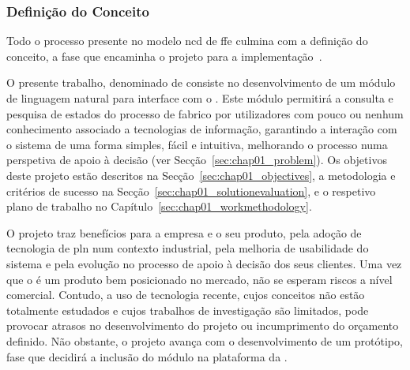 \subsubsection{Definição do Conceito}

Todo o processo presente no modelo \gls{ncd} de \gls{ffe} culmina com a definição do conceito, a fase que encaminha o projeto para a implementação~\parencite{ffe_effectivemethods_tools_techniques}.

O presente trabalho, denominado de  consiste no desenvolvimento de um módulo de linguagem natural para interface com o {\productname}. Este módulo permitirá a consulta e pesquisa de estados do processo de fabrico por utilizadores com pouco ou nenhum conhecimento associado a tecnologias de informação, garantindo a interação com o sistema de uma forma simples, fácil e intuitiva, melhorando o processo numa perspetiva de apoio à decisão (ver Secção~\ref{sec:chap01_problem}). Os objetivos deste projeto estão descritos na Secção~\ref{sec:chap01_objectives}, a metodologia e critérios de sucesso na Secção~\ref{sec:chap01_solutionevaluation}, e o respetivo plano de trabalho no Capítulo~\ref{sec:chap01_workmethodology}.

O projeto traz benefícios para a empresa e o seu produto, pela adoção de tecnologia de \gls{pln} num contexto industrial, pela melhoria de usabilidade do sistema e pela evolução no processo de apoio à decisão dos seus clientes. Uma vez que o {\productname} é um produto bem posicionado no mercado, não se esperam riscos a nível comercial. Contudo, a uso de tecnologia recente, cujos conceitos não estão totalmente estudados e cujos trabalhos de investigação são limitados, pode provocar atrasos no desenvolvimento do projeto ou incumprimento do orçamento definido. Não obstante, o projeto avança com o desenvolvimento de um protótipo, fase que decidirá a inclusão do módulo na plataforma da {\companyname}.